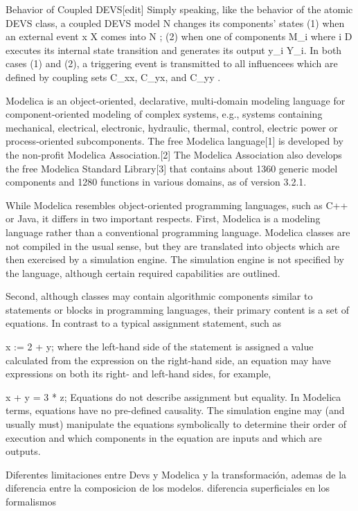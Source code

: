 \documentclass[a4paper,	11pt]{article}
\begin{document}
Behavior of Coupled DEVS[edit]
Simply speaking, like the behavior of the atomic DEVS class, a coupled DEVS model  N  changes its components' states (1) when an external event x \in X comes into  N ; (2) when one of components  M_i  where  i \in D  executes its internal state transition and generates its output  y_i \in Y_i. In both cases (1) and (2), a triggering event is transmitted to all influencees which are defined by coupling sets  C_{xx}, C_{yx}, and  C_{yy} .

Modelica is an object-oriented, declarative, multi-domain modeling language for component-oriented modeling of complex systems, e.g., systems containing mechanical, electrical, electronic, hydraulic, thermal, control, electric power or process-oriented subcomponents. The free Modelica language[1] is developed by the non-profit Modelica Association.[2] The Modelica Association also develops the free Modelica Standard Library[3] that contains about 1360 generic model components and 1280 functions in various domains, as of version 3.2.1.

While Modelica resembles object-oriented programming languages, such as C++ or Java, it differs in two important respects. First, Modelica is a modeling language rather than a conventional programming language. Modelica classes are not compiled in the usual sense, but they are translated into objects which are then exercised by a simulation engine. The simulation engine is not specified by the language, although certain required capabilities are outlined.

Second, although classes may contain algorithmic components similar to statements or blocks in programming languages, their primary content is a set of equations. In contrast to a typical assignment statement, such as

x := 2 + y;
where the left-hand side of the statement is assigned a value calculated from the expression on the right-hand side, an equation may have expressions on both its right- and left-hand sides, for example,

x + y = 3 * z;
Equations do not describe assignment but equality. In Modelica terms, equations have no pre-defined causality. The simulation engine may (and usually must) manipulate the equations symbolically to determine their order of execution and which components in the equation are inputs and which are outputs.

	
 Diferentes limitaciones entre Devs y Modelica y la transformación, ademas de la diferencia entre la composicion de los modelos.
 diferencia superficiales en los formalismos
\end{document}
